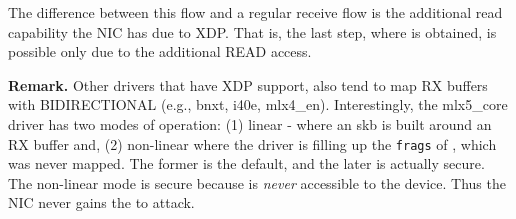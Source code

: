 The difference between this flow and a regular receive flow is the additional read capability the NIC has due to XDP. That is, the last step, where \means{} is obtained, is possible only due to the additional READ access.

\smallskip
\noindent\textbf{Remark.} Other drivers that have XDP support, also tend to map RX buffers with BIDIRECTIONAL (e.g., bnxt, i40e, mlx4\_en). Interestingly, the mlx5\_core driver has two modes of operation: (1) linear - where an skb is built around an RX buffer and, (2) non-linear where the driver is filling up the \texttt{frags} of \shinfo, which was never mapped. The former is the default, and the later is actually secure. The non-linear mode is secure because \shinfo{} is \emph{never} accessible to the device. Thus the NIC never gains the \oportunity{} to attack.




